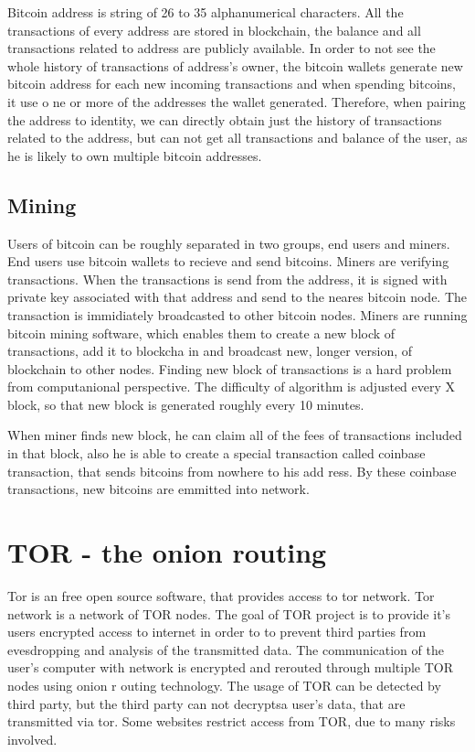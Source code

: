 \documentclass[
  digital, %
  table,   %
  lof,     %
  lot,     %
  oneside
]{fithesis3}
\begin{document}
Bitcoin address is string of 26 to 35 alphanumerical characters.
All the transactions of every address are stored in blockchain, the balance and all transactions related to address are
publicly available.
In order to not see the whole history of transactions of address's owner,
the bitcoin wallets generate new bitcoin address for each new incoming transactions and when spending bitcoins, it use o
ne or more of the addresses the wallet generated.
Therefore, when pairing the address to identity, we can directly obtain just the history of transactions related to the 
address,
but can not get all transactions and balance of the user, as he is likely to own multiple bitcoin addresses.

\subsection{Mining}
Users of bitcoin can be roughly separated in two groups, end users and miners.
End users use bitcoin wallets to recieve and send bitcoins.
Miners are verifying transactions. When the transactions is send from the address, 
it is signed with private key associated with that address and send to the neares bitcoin node.
The transaction is immidiately broadcasted to other bitcoin nodes.
Miners are running bitcoin mining software, which enables them to create a new block of transactions, add it to blockcha
in
and broadcast new, longer version, of blockchain to other nodes.
Finding new block of transactions is a hard problem from computanional perspective.
The difficulty of algorithm is adjusted every X block, so that new block is generated roughly every 10 minutes.

When miner finds new block, he can claim all of the fees of transactions included in that block,
also he is able to create a special transaction called coinbase transaction, that sends bitcoins from nowhere to his add
ress.
By these coinbase transactions, new bitcoins are emmitted into network.

\section{TOR - the onion routing}

Tor is an free open source software, that provides access to tor network. Tor network is a network of TOR nodes.
The goal of TOR project is to provide it's users encrypted access to internet in order to to prevent third parties
from evesdropping and analysis of the transmitted data.
The communication of the user's computer with network is encrypted and rerouted through multiple TOR nodes using onion r
outing technology.
The usage of TOR can be detected by third party, but the third party can not decryptsa user's data, that are transmitted
 via tor.
Some websites restrict access from TOR, due to many risks involved.
\end{document}
